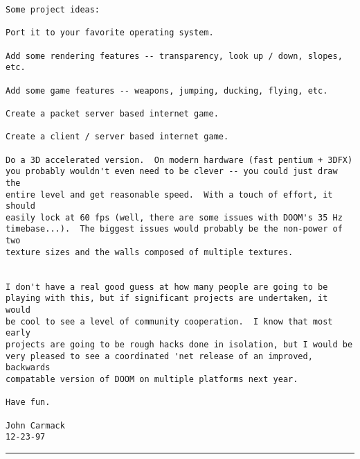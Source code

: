 \begin{verbatim}
Some project ideas:

Port it to your favorite operating system.

Add some rendering features -- transparency, look up / down, slopes,
etc.

Add some game features -- weapons, jumping, ducking, flying, etc.

Create a packet server based internet game.

Create a client / server based internet game.

Do a 3D accelerated version.  On modern hardware (fast pentium + 3DFX)
you probably wouldn't even need to be clever -- you could just draw the
entire level and get reasonable speed.  With a touch of effort, it should
easily lock at 60 fps (well, there are some issues with DOOM's 35 Hz
timebase...).  The biggest issues would probably be the non-power of two
texture sizes and the walls composed of multiple textures.


I don't have a real good guess at how many people are going to be
playing with this, but if significant projects are undertaken, it would
be cool to see a level of community cooperation.  I know that most early
projects are going to be rough hacks done in isolation, but I would be
very pleased to see a coordinated 'net release of an improved, backwards
compatable version of DOOM on multiple platforms next year.

Have fun.

John Carmack
12-23-97

\end{verbatim}
\par \hrule
